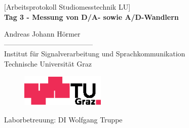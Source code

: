 \documentclass[11pt]{report}
\begin{document}
\begin{titlepage}
\begin{center}
  \vspace*{0.5cm}
  {\LARGE [Arbeitsprotokoll Studiomesstechnik LU]} \\
  \vspace{15mm}
  {\huge \bf Tag 3 - Messung von D/A- sowie A/D-Wandlern \\}

  \vspace{15mm}
  {\LARGE Andreas Johann Hörmer} \\
  \vspace{10mm}%
  -------------------------------------- \\
  \vspace{10mm}%
  \large
  Institut für Signalverarbeitung und Sprachkommunikation \\
  Technische Universit\"{a}t Graz \\


  \vspace{15mm}%
  \begin{figure}[!ht]
  \begin{center}
  \centerline{\includegraphics[width=4cm,keepaspectratio=true]{TULogoneu}}
  \end{center}
  \end{figure}
  \vspace{10mm}
Laborbetreuung: DI Wolfgang Truppe \\
  \vfill
  \vspace{0.5cm}
\end{center}
\end{titlepage}

\end{document}
